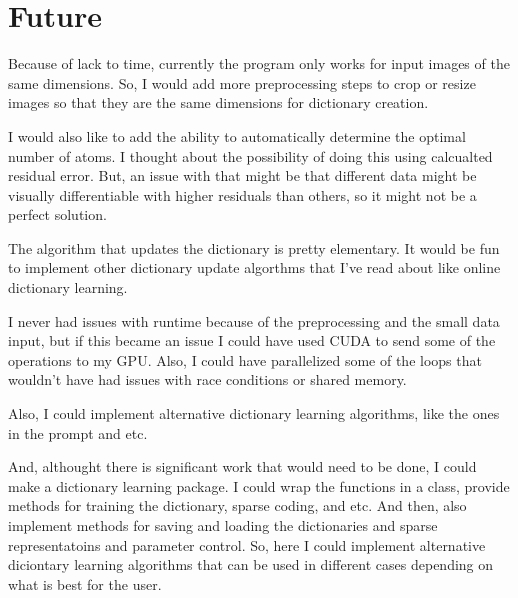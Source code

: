 \documentclass[11pt]{article}
\begin{document}
\section{Future}

Because of lack to time, currently the program only works for input images of the same dimensions. So, I would add more preprocessing steps to crop or resize images so that they are the same dimensions for dictionary creation. 

I would also like to add the ability to automatically determine the optimal number of atoms. I thought about the possibility of doing this using calcualted residual error. But, an issue with that might be that different data might be visually differentiable with higher residuals than others, so it might not be a perfect solution.

The algorithm that updates the dictionary is pretty elementary. It would be fun to implement other dictionary update algorthms that I've read about like online dictionary learning. 

I never had issues with runtime because of the preprocessing and the small data input, but if this became an issue I could have used CUDA to send some of the operations to my GPU. Also, I could have parallelized some of the loops that wouldn't have had issues with race conditions or shared memory. 

Also, I could implement alternative dictionary learning algorithms, like the ones in the prompt and etc.

And, althought there is significant work that would need to be done, I could make a dictionary learning package. I could wrap the functions in a class, provide methods for training the dictionary, sparse coding, and etc. And then, also implement methods for saving and loading the dictionaries and sparse representatoins and parameter control. So, here I could implement alternative diciontary learning algorithms that can be used in different cases depending on what is best for the user. 
\end{document}
